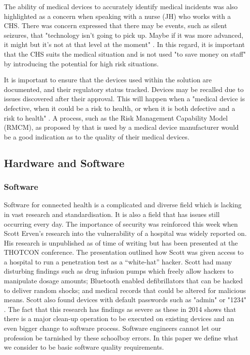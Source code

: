 The ability of medical devices to accurately identify medical incidents was also highlighted as a concern when speaking with a nurse (JH) who works with a CHS. There was concern expressed that there may be events, such as silent seizures, that "technology isn't going to pick up. Maybe if it was more advanced, it might but it's not at that level at the moment" \parencite{interview}. In this regard, it is important that the CHS suits the medical situation and is not used "to save money on staff" \parencite{interview} by introducing the potential for high risk situations. 

It is important to ensure that the devices used within the solution are documented, and their regulatory status tracked. Devices may be recalled due to issues discovered after their approval. This will happen when a "medical device is defective, when it could be a risk to health, or when it is both defective and a risk to health" \parencite{recall}. A process, such as the Risk Management Capability Model (RMCM), as proposed by \cite{risk} that is used by a medical device manufacturer would be a good indication as to the quality of their medical devices. 


\subsection{Hardware and Software}

\subsubsection{Software}

Software for connected health is a complicated and diverse field which is lacking in vast research and standardisation. It is also a field that has issues still occurring every day. The importance of security was reinforced this week when Scott Erven's research into the vulnerability of a hospital was widely reported on. His research is unpublished as of time of writing but has been presented at the THOTCON conference. The presentation outlined how Scott was given access to a hospital to run a penetration test as a “white-hat” hacker. Scott had many disturbing findings such as drug infusion pumps which freely allow hackers to manipulate dosage amounts; Bluetooth enabled defibrillators that can be hacked to deliver random shocks; and medical records that could be altered for malicious means. Scott also found devices with default passwords such as "admin" or "1234" \parencite{wired}. The fact that this research has findings as severe as these in 2014 shows that there is a major clean-up operation to be executed on existing devices and an even bigger change to software process. Software engineers cannot let our profession be tarnished by these schoolboy errors. In this paper we define what we consider to be basic software quality requirements.

